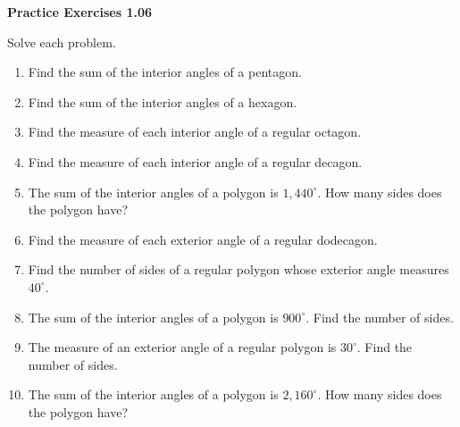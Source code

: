 \vspace{0.3ex}
\noindent\textbf{Practice Exercises 1.06}

\vspace{0.2ex}

Solve each problem.
\begin{enumerate}
    \item Find the sum of the interior angles of a pentagon.
    \item Find the sum of the interior angles of a hexagon.
    \item Find the measure of each interior angle of a regular octagon.
    \item Find the measure of each interior angle of a regular decagon.
    \item The sum of the interior angles of a polygon is \( 1,440^\circ \). How many sides does the polygon have?
    \item Find the measure of each exterior angle of a regular dodecagon.
    \item Find the number of sides of a regular polygon whose exterior angle measures \( 40^\circ \).
    \item The sum of the interior angles of a polygon is \( 900^\circ \). Find the number of sides.
    \item The measure of an exterior angle of a regular polygon is \( 30^\circ \). Find the number of sides.
    \item The sum of the interior angles of a polygon is \( 2,160^\circ \). How many sides does the polygon have?
\end{enumerate}
